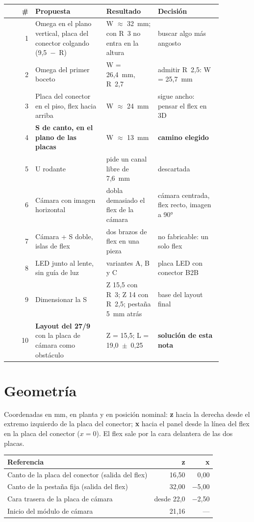 \documentclass[11pt,a4paper]{article}
\renewcommand{\arraystretch}{1.25}
\begin{document}
\begin{table}[H]\centering\footnotesize\setlength{\tabcolsep}{4pt}\renewcommand{\arraystretch}{1.1}
\begin{tabular}{r >{\raggedright\arraybackslash}p{0.33\linewidth} >{\raggedright\arraybackslash}p{0.24\linewidth} >{\raggedright\arraybackslash}p{0.30\linewidth}}
\toprule
\# & Propuesta & Resultado & Decisión\\
\midrule
1 & Omega en el plano vertical, placa del conector colgando (9,5~$-$~R) & W $\approx$ 32~mm; con R~3 no entra en la altura & buscar algo más angosto\\
2 & Omega del primer boceto & W = 26,4~mm, R~2,7 & admitir R~2,5: W = 25,7~mm\\
3 & Placa del conector en el piso, flex hacia arriba & W $\approx$ 24~mm & sigue ancho: pensar el flex en 3D\\
4 & \textbf{S de canto, en el plano de las placas} & W $\approx$ 13~mm & \textbf{camino elegido}\\
5 & U rodante & pide un canal libre de 7,6~mm & descartada\\
6 & Cámara con imagen horizontal & dobla demasiado el flex de la cámara & cámara centrada, flex recto, imagen a 90°\\
7 & Cámara + S doble, islas de flex & dos brazos de flex en una pieza & no fabricable: un solo flex\\
8 & LED junto al lente, sin guía de luz & variantes A, B y C & placa LED con conector B2B\\
9 & Dimensionar la S & Z 15,5 con R~3; Z 14 con R~2,5; pestaña 5~mm atrás & base del layout final\\
10 & \textbf{Layout del 27/9} con la placa de cámara como obstáculo & Z = 15,5; L = 19,0~$\pm$~0,25 & \textbf{solución de esta nota}\\
\bottomrule
\end{tabular}
\end{table}

\section{Geometría}\label{sec:geometria}
Coordenadas en mm, en planta y en posición nominal: \textbf{z} hacia la derecha desde el extremo izquierdo
de la placa del conector; \textbf{x} hacia el panel desde la línea del flex en la placa del conector
($x = 0$). El flex sale por la cara delantera de las dos placas.

\begin{table}[H]\centering\small
\begin{tabular}{l r r}
\toprule
Referencia & z & x\\
\midrule
Canto de la placa del conector (salida del flex) & 16,50 & 0,00\\
Canto de la pestaña fija (salida del flex) & 32,00 & $-$5,00\\
Cara trasera de la placa de cámara & desde 22,0 & $-$2,50\\
Inicio del módulo de cámara & 21,16 & ---\\
\bottomrule
\end{tabular}
\end{table}
\end{document}
